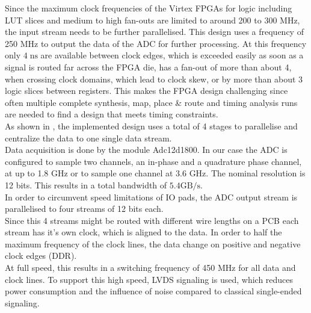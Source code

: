 Since the maximum clock frequencies of the Virtex \glspl{FPGA} for logic
including \gls{LUT} slices and medium to high fan-outs
are limited to around 200 to 300 MHz, the input stream needs to be further
parallelised. This design uses a frequency of 250 MHz to output
the data of the \gls{ADC} for further processing. At this frequency
only $4\;\text{ns}$ are available between clock edges, which is exceeded
easily as soon as a signal is routed far across the \gls{FPGA} die,
has a fan-out of more than about 4, when crossing clock domains, which lead
to clock skew, or by more than about 3 logic slices between registers.
This makes the \gls{FPGA} design challenging since often multiple
complete synthesis, map, place \& route and timing analysis runs are
needed to find a design that meets timing constraints. \\

As shown in , the implemented design uses
a total of 4 stages to parallelise and centralize the data to
one single data stream. \\

Data acquisition is done by the module Adc12d1800. In our case the ADC is
configured to sample two channels, an in-phase and a quadrature phase channel,
at up to 1.8 GHz or to sample one channel at 3.6 GHz.
The nominal resolution is 12 bits. This results in a total bandwidth of
$5.4 \text{GB}/\text{s}$. \\
In order to circumvent speed limitations of \gls{IO} pads,
the \gls{ADC} output stream is parallelised to four streams of 12 bits each. \\

Since this 4 streams might be routed with different wire lengths on a \gls{PCB}
each stream has it's own clock, which is aligned to the data.
In order to half the maximum frequency of the clock lines,
the data change on positive and negative clock edges (\gls{DDR}). \\

At full speed, this results in a switching frequency of 450 MHz for all data
and clock lines. To support this high speed, \gls{LVDS} signaling is used,
which reduces power consumption and the influence of noise
compared to classical single-ended signaling. \\

